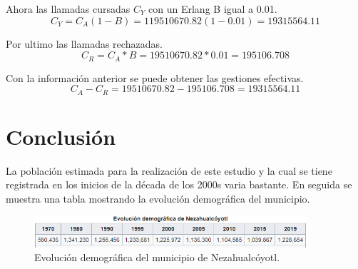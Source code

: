 \documentclass[11pt,letterpaper]{article}
\begin{document}
Ahora las llamadas cursadas $C_Y$ con un Erlang B igual a 0.01.
\begin{equation}
    C_Y=C_A(1-B)=119510670.82(1-0.01)=19315564.11
\end{equation}

Por ultimo las llamadas rechazadas.
\begin{equation}
    C_R=C_A*B=19510670.82*0.01=195106.708
\end{equation}

Con la información anterior se puede obtener las gestiones efectivas.
\begin{equation}
    C_A-C_R=19510670.82-195106.708=19315564.11
\end{equation}

\newpage
\section{Conclusión}
La población estimada para la realización de este estudio y la cual se tiene registrada 
en los inicios de la década de los 2000s varia bastante. En seguida se muestra una 
tabla mostrando la evolución demográfica del municipio.
\begin{figure}[ht]
    \centering
    \includegraphics[width=0.9\textwidth]{imagenes/t31.png}
    \caption{Evolución demográfica del municipio de Nezahualcóyotl.}
\end{figure}
\end{document}

